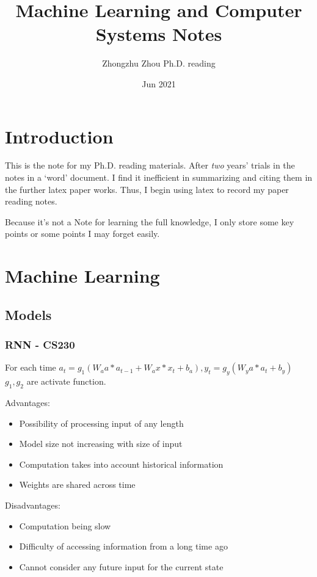 \documentclass[UTF8]{article}
\title{Machine Learning and Computer Systems Notes}
\author{Zhongzhu Zhou Ph.D. reading}
\date{Jun 2021}
\begin{document}
\maketitle

\tableofcontents

\section{Introduction}
This is the note for my Ph.D. reading materials. After \emph{two} years' trials in the notes in a `word' document. I find it inefficient in summarizing and citing them in the further latex paper works. Thus, I begin using latex to record my paper reading notes.

Because it's not a Note for learning the full knowledge, I only store some key points or some points I may forget easily.

\section{Machine Learning}
\subsection{Models}
\subsubsection{RNN - CS230}
For each time $a_t = g_1(W_aa*a_{t-1} + W_ax*x_{t} + b_a), y_t = g_y(W_ya*a_{t} + b_y)$ $g_1,g_2$ are activate function. 

Advantages:\\
\begin{itemize}
    \item Possibility of processing input of any length
    \item Model size not increasing with size of input
    \item Computation takes into account historical information
    \item Weights are shared across time
\end{itemize}

Disadvantages:\\
\begin{itemize}
    \item Computation being slow
    \item Difficulty of accessing information from a long time ago
    \item Cannot consider any future input for the current state
\end{itemize}
\end{document}
